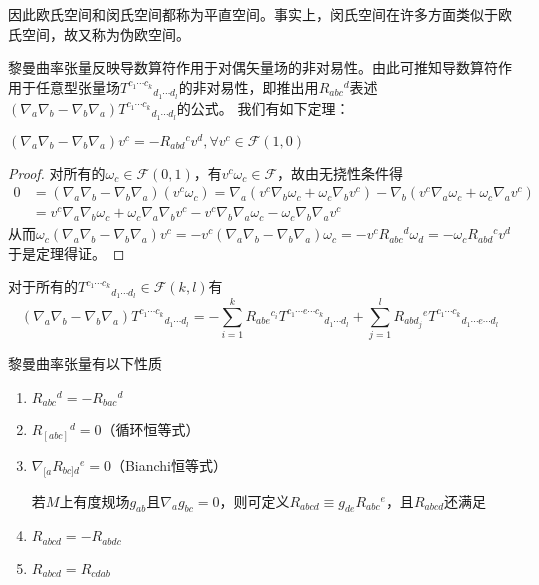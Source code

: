 因此欧氏空间和闵氏空间都称为平直空间。事实上，闵氏空间在许多方面类似于欧氏空间，故又称为伪欧空间。

黎曼曲率张量反映导数算符作用于对偶矢量场的非对易性。由此可推知导数算符作用于任意型张量场$T^{c_1 \cdots c_k}{}_{d_1 \cdots d_l}$的非对易性，即推出用$R_{abc}{}^d$表述$(\nabla_a\nabla_b - \nabla_b\nabla_a)T^{c_1 \cdots c_k}{}_{d_1 \cdots d_l}$的公式。
我们有如下定理：

\begin{theorem}
$(\nabla_a\nabla_b - \nabla_b\nabla_a)v^c = -R_{abd}{}^cv^d, \forall v^c \in \mathscr{F}(1, 0)$
\end{theorem}

\begin{proof}
对所有的$\omega_c \in \mathscr{F}(0, 1)$，有$v^c\omega_c \in \mathscr{F}$，故由无挠性条件得
$$\begin{aligned}
0 & = (\nabla_a\nabla_b - \nabla_b\nabla_a)(v^c\omega_c) = \nabla_a(v^c\nabla_b\omega_c + \omega_c\nabla_bv^c) - \nabla_b(v^c\nabla_a\omega_c + \omega_c\nabla_av^c) \\
& = v^c\nabla_a\nabla_b\omega_c + \omega_c\nabla_a\nabla_bv^c - v^c\nabla_b\nabla_a\omega_c - \omega_c\nabla_b\nabla_av^c
\end{aligned}$$
从而$\omega_c(\nabla_a\nabla_b - \nabla_b\nabla_a)v^c = -v^c(\nabla_a\nabla_b - \nabla_b\nabla_a)\omega_c = -v^cR_{abc}{}^d\omega_d = -\omega_cR_{abd}{}^cv^d$
于是定理得证。
\end{proof}

\begin{theorem}
对于所有的$T^{c_1 \cdots c_k}{}_{d_1 \cdots d_l} \in \mathscr{F}(k, l)$有
$$(\nabla_a\nabla_b - \nabla_b\nabla_a)T^{c_1 \cdots c_k}{}_{d_1 \cdots d_l} = -\sum^k_{i = 1}R_{abe}{}^{c_i}T^{c_1 \cdots e \cdots c_k}{}_{d_1 \cdots d_l} + \sum^l_{j = 1}R_{abd_j}{}^eT^{c_1 \cdots c_k}{}_{d_1 \cdots e \cdots d_l}$$
\end{theorem}

\begin{theorem}
黎曼曲率张量有以下性质
\begin{enumerate}[（1）]
\item $R_{abc}{}^d = -R_{bac}{}^d$
\item $R_{[abc]}{}^d = 0$（循环恒等式）
\item $\nabla_{[a}R_{bc]d}{}^e = 0$（Bianchi恒等式）

若$M$上有度规场$g_{ab}$且$\nabla_ag_{bc} = 0$，则可定义$R_{abcd} \equiv g_{de}R_{abc}{}^e$，且$R_{abcd}$还满足

\item $R_{abcd} = -R_{abdc}$
\item $R_{abcd} = R_{cdab}$
\end{enumerate}
\end{theorem}

